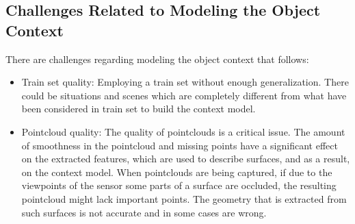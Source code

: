 
\subsection{Challenges Related to Modeling the Object Context}

There are challenges regarding modeling the object context that follows:

\begin{itemize}
%    
 \item Train set quality: Employing a train set without enough generalization. There could be situations and scenes which are completely different from
	what have been considered in train set to build the context model.
	
 \item Pointcloud quality: The quality of pointclouds is a critical issue. The amount of smoothness in the pointcloud and missing points have a 
 significant effect on the extracted features, which are used to describe surfaces, and as a result, on the context model. 
 When pointclouds are being captured, if due to the viewpoints of the sensor some parts of a surface are occluded, 
 the resulting pointcloud might lack important points.
 The geometry that is extracted from such surfaces is not accurate and in some cases are wrong.
 
\end{itemize}

